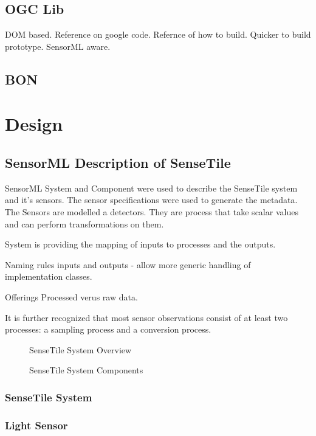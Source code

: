 \documentclass[]{final_report}
\begin{document}
\section{OGC Lib}
DOM based. Reference on google code. Refernce of how to build. Quicker to build prototype. SensorML aware.

\section{BON}

\chapter{Design}
\section{SensorML Description of SenseTile}

SensorML System and Component were used to describe the SenseTile system and it's sensors. The sensor specifications were used to generate the metadata.
The Sensors are modelled a detectors. They are process that take scalar values
and can perform transformations on them.

System is providing the mapping of inputs to processes and the outputs.

Naming rules inputs and outputs - allow more generic handling of implementation classes.

Offerings Processed verus raw data.

It is further recognized that most sensor observations consist of at least two processes: a sampling process and a conversion process.

 \begin{figure}
\caption{SenseTile System Overview}\label{fig:SenseTileSystem.pdf}
\end{figure}

 \begin{figure}
\caption{SenseTile System Components}\label{fig:SensorML_SenseTile_System_2_pa1.pdf}
\end{figure}

\subsection{SenseTile System}
\subsection{Light Sensor}
\end{document}

